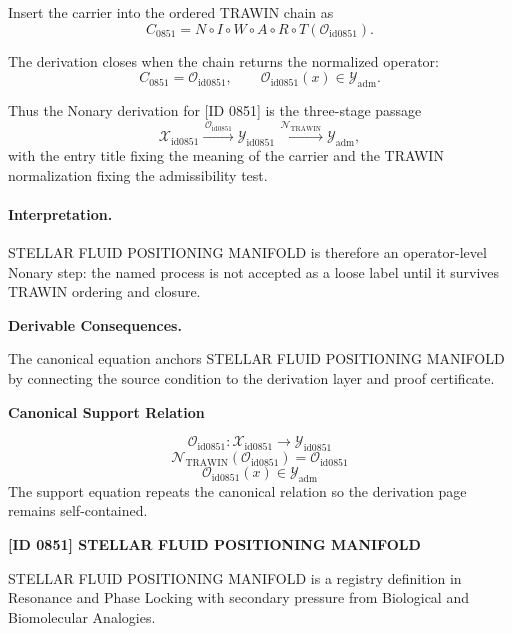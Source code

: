 Insert the carrier into the ordered TRAWIN chain as\[
C_{0851}=N\circ I\circ W\circ A\circ R\circ T(\mathcal{O}_{\mathrm{id0851}}).
\]

The derivation closes when the chain returns the normalized operator:\[
C_{0851}=\mathcal{O}_{\mathrm{id0851}},\qquad \mathcal{O}_{\mathrm{id0851}}(x)\in\mathcal{Y}_{\mathrm{adm}}.
\]

Thus the Nonary derivation for [ID 0851] is the three-stage passage
\[
\mathcal{X}_{\mathrm{id0851}}\xrightarrow{\,\mathcal{O}_{\mathrm{id0851}}\,} \mathcal{Y}_{\mathrm{id0851}}\xrightarrow{\,\mathcal{N}_{\mathrm{TRAWIN}}\,} \mathcal{Y}_{\mathrm{adm}},
\]
with the entry title fixing the meaning of the carrier and the TRAWIN normalization fixing the admissibility test.

\paragraph{Interpretation.} STELLAR FLUID POSITIONING MANIFOLD is therefore an operator-level Nonary step: the named process is not accepted as a loose label until it survives TRAWIN ordering and closure.

\par\vspace{0.35em}
\noindent\textbf{Derivable Consequences.}\quad
\begingroup
\footnotesize
\raggedright
The canonical equation anchors STELLAR FLUID POSITIONING MANIFOLD by connecting the source condition to the derivation layer and proof certificate.
\par\endgroup

\noindent\textbf{Canonical Support Relation}\par
\[
\mathcal{O}_{\mathrm{id0851}}:\mathcal{X}_{\mathrm{id0851}}\longrightarrow\mathcal{Y}_{\mathrm{id0851}}
\]
\[
\mathcal{N}_{\mathrm{TRAWIN}}(\mathcal{O}_{\mathrm{id0851}})=\mathcal{O}_{\mathrm{id0851}}
\]
\[
\mathcal{O}_{\mathrm{id0851}}(x)\in\mathcal{Y}_{\mathrm{adm}}
\]
\noindent The support equation repeats the canonical relation so the derivation page remains self-contained.\par

\clearpage
\noindent\textbf{[ID 0851] STELLAR FLUID POSITIONING MANIFOLD}\par
\vspace{0.35em}
\begingroup\small
{}
STELLAR FLUID POSITIONING MANIFOLD is a registry definition in Resonance and Phase Locking with secondary pressure from Biological and Biomolecular Analogies.

